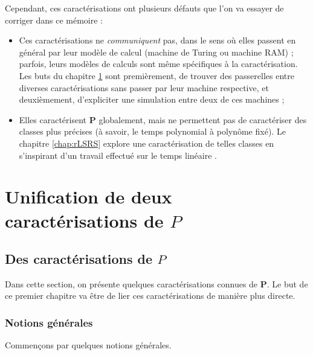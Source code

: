 \documentclass{report}
\begin{document}
	Cependant, ces caractérisations ont plusieurs défauts que l'on va essayer de corriger dans ce mémoire :
	
	\begin{itemize}
		\item 
				Ces caractérisations ne \emph{communiquent} pas, dans le sens où elles passent en général par leur modèle de calcul (machine de Turing ou machine RAM) ; parfois, leurs modèles de calculs sont même spécifiques à la caractérisation. Les buts du chapitre \ref{chap:unif_P} sont premièrement, de trouver des passerelles entre diverses caractérisations sans passer par leur machine respective, et deuxièmement, d'expliciter une simulation entre deux de ces machines ;
				
		\item 
				Elles caractérisent $\textbf{P}$ globalement, mais ne permettent pas de caractériser des classes plus précises (à savoir, le temps polynomial à polynôme fixé). Le chapitre \ref{chap:rLSRS} explore une caractérisation de telles classes en s'inspirant d'un travail effectué sur le temps linéaire \cite{GrandjeanSchwentick2002}.
	\end{itemize}
	
	
	\pagebreak
	
	\chapter{Unification de deux caractérisations de $P$}
	\label{chap:unif_P}
	
	\section{Des caractérisations de $P$}
		\label{sec:caracterisations_P}
	
		Dans cette section, on présente quelques caractérisations connues de $\textbf{P}$. Le but de ce premier chapitre va être de lier ces caractérisations de manière plus directe. 
	
		\subsection{Notions générales}
			\label{subsec:notions_generales}
		
			Commençons par quelques notions générales.
	
\end{document}
